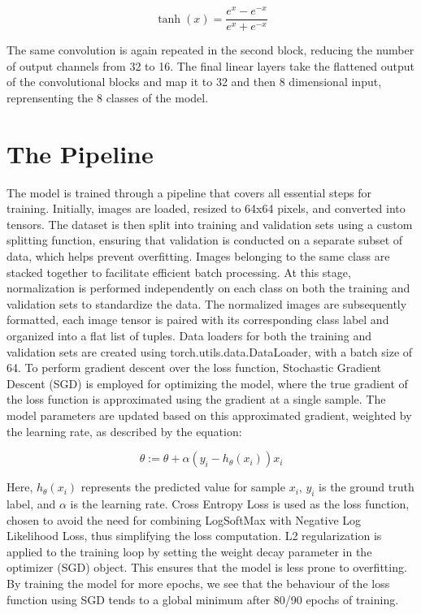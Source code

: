 \documentclass[twocolumn, fontsize=10pt]{article}
\begin{document}
\[
\tanh(x) = \frac{e^x - e^{-x}}{e^x + e^{-x}}
\]

The same convolution is again repeated in the second block, reducing the number of output channels from 32 to 16. The final linear layers take the flattened output of the convolutional blocks and map it to 32 and then 8 dimensional input, reprensenting the 8 classes of the model.

\section{The Pipeline}
The model is trained through a pipeline that covers all essential steps for training. Initially, images are loaded, resized to 64x64 pixels, and converted into tensors. The dataset is then split into training and validation sets using a custom splitting function, ensuring that validation is conducted on a separate subset of data, which helps prevent overfitting. Images belonging to the same class are stacked together to facilitate efficient batch processing. At this stage, normalization is performed independently on each class on both the training and validation sets to standardize the data. The normalized images are subsequently formatted, each image tensor is paired with its corresponding class label and organized into a flat list of tuples. Data loaders for both the training and validation sets are created using torch.utils.data.DataLoader, with a batch size of 64. To perform gradient descent over the loss function, Stochastic Gradient Descent (SGD) is employed for optimizing the model, where the true gradient of the loss function is approximated using the gradient at a single sample. The model parameters are updated based on this approximated gradient, weighted by the learning rate, as described by the equation:

\[
\theta := \theta + \alpha(y_i - h_{\theta}(x_i))x_i
\]

Here, \(h_{\theta}(x_i)\) represents the predicted value for sample \(x_i\), \(y_i\) is the ground truth label, and \(\alpha\) is the learning rate. Cross Entropy Loss is used as the loss function, chosen to avoid the need for combining LogSoftMax with Negative Log Likelihood Loss, thus simplifying the loss computation. L2 regularization is applied to the training loop by setting the weight decay parameter in the optimizer (SGD) object. This ensures that the model is less prone to overfitting. By training the model for more epochs, we see that the behaviour of the loss function using SGD tends to a global minimum after 80/90 epochs of training.
\end{document}
